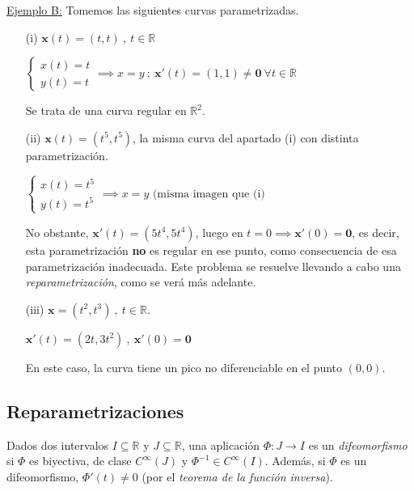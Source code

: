 \begin{mybox}
    \underline{Ejemplo B:} Tomemos las siguientes curvas parametrizadas.

    \begin{enumerate}
        \item[(i)] $\mathbf{x}(t)=(t,t) \ , \ t\in \mathbb{R}$
        
        $
        \left \{
        \begin{array}{c}
             x(t)=t \\
             y(t)=t
        \end{array}
        \right . \implies x=y\ ; \ \mathbf{x'}(t)=(1,1)\neq \mathbf{0}\  \forall t\in \mathbb{R}
        $

        Se trata de una curva regular en $\mathbb{R}^2$.

        \item[(ii)] $\mathbf{x}(t)=(t^5,t^5)$, la misma curva del apartado (i) con distinta parametrización.
        
        $
        \left \{
        \begin{array}{c}
             x(t)=t^5 \\
             y(t)=t^5
        \end{array}
        \right . \implies x=y \text{ (misma imagen que (i)}
        $
        
        No obstante, $\mathbf{x'}(t)=(5t^4,5t^4)$, luego en $t=0 \implies \mathbf{x'}(0)=\mathbf{0}$, es decir, esta parametrización \textbf{no} es regular en ese punto, como consecuencia de esa parametrización inadecuada. Este problema se resuelve llevando a cabo una \emph{reparametrización}, como se verá más adelante.

        \item[(iii)] $\mathbf{x}=(t^2,t^3) \ , \ t\in \mathbb{R}$.

        $
        \mathbf{x'}(t)=(2t,3t^2) \ , \ \mathbf{x'}(0)=\mathbf{0}
        $

        En este caso, la curva tiene un pico no diferenciable en el punto $(0,0)$.

    \end{enumerate}
\end{mybox}

\subsection{Reparametrizaciones}
Dados dos intervalos $I\subseteq \mathbb{R}$ y $J\subseteq \mathbb{R}$, una aplicación $\Phi:J\longrightarrow I$ es un \emph{difeomorfismo} si $\Phi$ es biyectiva, de clase $C^\infty (J)$ y $\Phi^{-1} \in C^\infty (I)$. Además, si $\Phi$ es un difeomorfismo, $\Phi'(t)\neq 0$ (por el \emph{teorema de la función inversa}).

